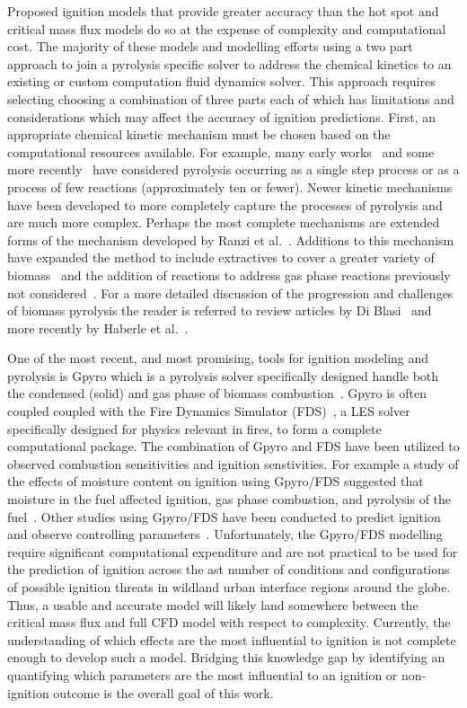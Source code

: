     Proposed ignition models that provide greater accuracy than the hot spot and critical mass flux models do so at the expense of complexity and computational cost. The majority of these models and modelling efforts using a two part approach to join a pyrolysis specific solver to address the chemical kinetics to an existing or custom computation fluid dynamics solver. This approach requires selecting choosing a combination of three parts each of which has limitations and considerations which may affect the accuracy of ignition predictions. First, an appropriate chemical kinetic mechanism must be chosen based on the computational resources available. For example, many early works~\cite{DiBlasi1996} and some more recently~\cite{Ding2015, Torero2020} have considered pyrolysis occurring as a single step process or as a process of few reactions (approximately ten or fewer). Newer kinetic mechanisms have been developed to more completely capture the processes of pyrolysis and are much more complex. Perhaps the most complete mechanisms are extended forms of the mechanism developed by Ranzi et al.~\cite{Ranzi2008}. Additions to this mechanism have expanded the method to include extractives to cover a greater variety of biomass~\cite{Debiagi2015} and the addition of reactions to address gas phase reactions previously not considered~\cite{Dhahak2019}. For a more detailed discussion of the progression and challenges of biomass pyrolysis the reader is referred to review articles by Di Blasi~\cite{DIBLASI199371} and more recently by Haberle et al.~\cite{Haberle2017}. 
    
    One of the most recent, and most promising, tools for ignition modeling and pyrolysis is Gpyro which is a pyrolysis solver specifically designed handle both the condensed (solid) and gas phase of biomass combustion~\cite{Lautenberger2009a}. Gpyro is often coupled coupled with the Fire Dynamics Simulator (FDS)~\cite{FDSManual}, a LES solver specifically designed for physics relevant in fires, to form a complete computational package. The combination of Gpyro and FDS have been utilized to observed combustion sensitivities and ignition senstivities. For example a study of the effects of moisture content on ignition using Gpyro/FDS suggested that moisture in the fuel affected ignition, gas phase combustion, and pyrolysis of the fuel~\cite{Yashwanth2016}. Other studies using Gpyro/FDS have been conducted to predict ignition and observe controlling parameters~\cite{Shotorban2018, Fernandez-Pello2015, Lautenberger2009}. Unfortunately, the Gpyro/FDS modelling require significant computational expenditure and are not practical to be used for the prediction of ignition across the  ast number of conditions and configurations of possible ignition threats in wildland urban interface regions around the globe. Thus, a usable and accurate model will likely land somewhere between the critical mass flux and full CFD model with respect to complexity. Currently, the understanding of which effects are the most influential to ignition is not complete enough to develop such a model. Bridging this knowledge gap by identifying an quantifying which parameters are the most influential to an ignition or non-ignition outcome is the overall goal of this work. 

